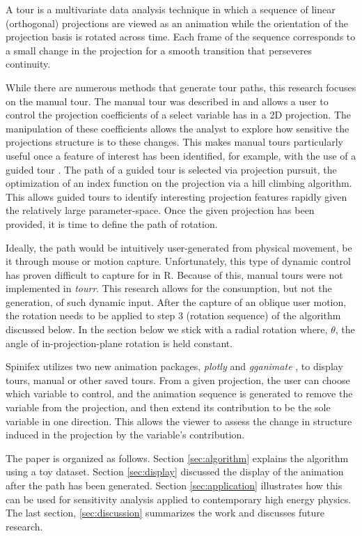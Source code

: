 \documentclass{monashthesis}
\begin{document}
A tour is a multivariate data analysis technique in which a sequence of linear (orthogonal) projections are viewed as an animation while the orientation of the projection basis is rotated across time. Each frame of the sequence corresponds to a small change in the projection for a smooth transition that perseveres continuity.

While there are numerous methods that generate tour paths, this research focuses on the manual tour. The manual tour was described in \textcite{cook_manual_1997} and allows a user to control the projection coefficients of a select variable has in a 2D projection. The manipulation of these coefficients allows the analyst to explore how sensitive the projections structure is to these changes. This makes manual tours particularly useful once a feature of interest has been identified, for example, with the use of a guided tour \autocite{cook_grand_1995}. The path of a guided tour is selected via projection pursuit, the optimization of an index function on the projection via a hill climbing algorithm. This allows guided tours to identify interesting projection features rapidly given the relatively large parameter-space. Once the given projection has been provided, it is time to define the path of rotation.

Ideally, the path would be intuitively user-generated from physical movement, be it through mouse or motion capture. Unfortunately, this type of dynamic control has proven difficult to capture for in R. Because of this, manual tours were not implemented in \emph{tourr}. This research allows for the consumption, but not the generation, of such dynamic input. After the capture of an oblique user motion, the rotation needs to be applied to step 3 (rotation sequence) of the algorithm discussed below. In the section below we stick with a radial rotation where, \(\theta\), the angle of in-projection-plane rotation is held constant.

Spinifex utilizes two new animation packages, \emph{plotly} \autocite{sievert_plotly_2018} and \emph{gganimate} \autocite{pedersen_gganimate:_2019}, to display tours, manual or other saved tours. From a given projection, the user can choose which variable to control, and the animation sequence is generated to remove the variable from the projection, and then extend its contribution to be the sole variable in one direction. This allows the viewer to assess the change in structure induced in the projection by the variable's contribution.

The paper is organized as follows. Section \ref{sec:algorithm} explains the algorithm using a toy dataset. Section \ref{sec:display} discussed the display of the animation after the path has been generated. Section \ref{sec:application} illustrates how this can be used for sensitivity analysis applied to contemporary high energy physics. The last section, \ref{sec:discussion} summarizes the work and discusses future research.
\end{document}
